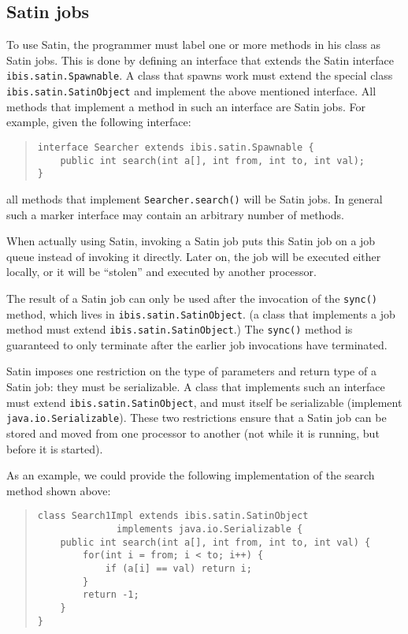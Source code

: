 \documentclass[10pt]{article}
\newcommand{\mysubsection}[1]{\subsection{#1}\label{#1}}
\begin{document}
\mysubsection{Satin jobs}

To use Satin, the programmer must label one or more methods in his class
as Satin jobs. This is done by defining an interface that extends
the Satin interface \verb+ibis.satin.Spawnable+.
A class that spawns work must extend the special class
\texttt{ibis.satin.SatinObject} and implement the above mentioned interface.
All methods that implement a method in such an
interface are Satin jobs. For example, given the following interface:

\begin{quote}
\begin{verbatim}
interface Searcher extends ibis.satin.Spawnable {
    public int search(int a[], int from, int to, int val);
}
\end{verbatim}
\end{quote}
\noindent
all methods that implement \verb+Searcher.search()+ will be Satin jobs.
In general such a marker interface may contain an arbitrary number
of methods.

When actually using Satin, invoking a Satin job puts this Satin job
on a job queue instead of invoking it directly.
Later on, the job will be executed either locally, or it will be
``stolen'' and executed by another processor.

The result of a Satin job can only be used after the invocation
of the \verb+sync()+ method, which lives in \verb+ibis.satin.SatinObject+.
(a class that implements a job method must extend
\verb+ibis.satin.SatinObject+.)
The \verb+sync()+
method is guaranteed to only terminate after the earlier job
invocations have terminated.

Satin imposes one restriction on the type of parameters and return type
of a Satin job: they must be serializable.
A class that implements such an interface must extend
\verb+ibis.satin.SatinObject+, and must itself be serializable
(implement \verb+java.io.Serializable+).
These two restrictions ensure that a Satin job can be stored and
moved from one processor to another (not while it is running, but before
it is started).

As an example, we could provide the following implementation of the
search method shown above:

\begin{quote}
\begin{verbatim}
class Search1Impl extends ibis.satin.SatinObject
              implements java.io.Serializable {
    public int search(int a[], int from, int to, int val) {
        for(int i = from; i < to; i++) {
            if (a[i] == val) return i;
        }
        return -1;
    }
}
\end{verbatim}
\end{quote}
\end{document}
